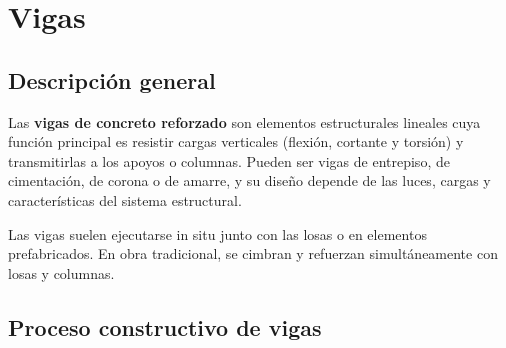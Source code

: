 \documentclass[12pt]{article}
\begin{document}
	\section{Vigas}
	\subsection{Descripción general}
	
	Las \textbf{vigas de concreto reforzado} son elementos estructurales lineales cuya función principal es resistir cargas verticales (flexión, cortante y torsión) y transmitirlas a los apoyos o columnas. Pueden ser vigas de entrepiso, de cimentación, de corona o de amarre, y su diseño depende de las luces, cargas y características del sistema estructural.
	
	Las vigas suelen ejecutarse in situ junto con las losas o en elementos prefabricados. En obra tradicional, se cimbran y refuerzan simultáneamente con losas y columnas.
	
	\subsection{Proceso constructivo de vigas}
	
\end{document}
